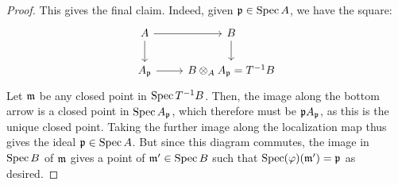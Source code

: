 \begin{proof}
	This gives the final claim. Indeed, given $\mathfrak{p} \in \operatorname{Spec} A$, we have the square:
	\[ \begin{tikzcd} A \arrow{r}{} \arrow{d}{} & B \arrow{d}{} \\ A_\frp \arrow{r}{} & B \otimes_A A_\frp = T^{-1}B \end{tikzcd} \]
	Let $\mathfrak{m}$ be any closed point in $\operatorname{Spec} T^{-1}B$. Then, the image along the bottom arrow is a closed point in $\operatorname{Spec} A_{\mathfrak{p}}$, which therefore must be $\mathfrak{p} A_{\mathfrak{p}}$, as this is the unique closed point. Taking the further image along the localization map thus gives the ideal $\mathfrak{p} \in \operatorname{Spec} A$. But since this diagram commutes, the image in $\operatorname{Spec} B$ of $\mathfrak{m}$ gives a point of $\mathfrak{m}' \in \operatorname{Spec} B$ such that $\operatorname{Spec}(\varphi)(\mathfrak{m}') = \mathfrak{p}$ as desired.
\end{proof}
